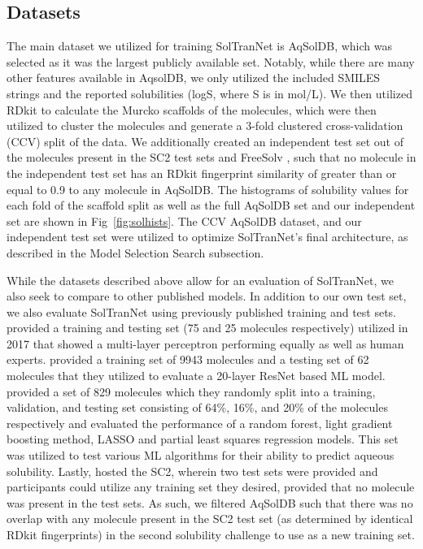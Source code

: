 \documentclass[journal=jmcmar,manuscript=article]{achemso}
\begin{document}
\subsection{Datasets}
The main dataset we utilized for training SolTranNet is AqSolDB\cite{AqSol}, which was selected as it was the largest publicly available set.
Notably, while there are many other features available in AqsolDB, we only utilized the included SMILES strings and the reported solubilities (logS, where S is in mol/L).
We then utilized RDkit\cite{rdkit} to calculate the Murcko scaffolds of the molecules, which were then utilized to cluster the molecules and generate a 3-fold clustered cross-validation (CCV) split of the data.
We additionally created an independent test set out of the molecules present in the SC2 test sets \cite{llinas} and FreeSolv \cite{freesolv}, such that no molecule in the independent test set has an RDkit fingerprint similarity of greater than or equal to 0.9 to any molecule in AqSolDB.
The histograms of solubility values for each fold of the scaffold split as well as the full AqSolDB set and our independent set are shown in Fig~\ref{fig:solhists}.
The CCV AqSolDB dataset, and our independent test set were utilized to optimize SolTranNet's final architecture, as described in the Model Selection Search subsection.

While the datasets described above allow for an evaluation of SolTranNet, we also seek to compare to other published models. In addition to our own test set, we also evaluate SolTranNet using previously published training and test sets.
\citet{boobier} provided a training and testing set (75 and 25 molecules respectively) utilized in 2017 that showed a multi-layer perceptron performing equally as well as human experts.
\citet{cui} provided a training set of 9943 molecules and a testing set of 62 molecules that they utilized to evaluate a  20-layer ResNet based ML model.
\citet{lovric} provided a set of 829 molecules which they randomly split into a training, validation, and testing set consisting of 64\%, 16\%, and 20\% of the molecules respectively and evaluated the performance of a random forest, light gradient boosting method, LASSO and partial least squares regression models.
This set was utilized to test various ML algorithms for their ability to predict aqueous solubility.
Lastly, \citet{llinas} hosted the SC2, wherein two test sets were provided and participants could utilize any training set they desired, provided that no molecule was present in the test sets.
As such, we filtered AqSolDB such that there was no overlap with any molecule present in the SC2 test set (as determined by identical RDkit fingerprints) in the second solubility challenge to use as a new training set.
\end{document}

